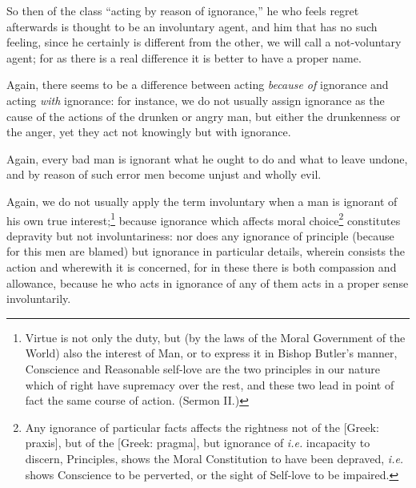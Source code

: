So then of the class “acting by reason of ignorance,” he who feels
regret afterwards is thought to be an involuntary agent, and him that has no
such feeling, since he certainly is different from the other, we will call a
not-voluntary agent; for as there is a real difference it is better to have a
proper name.

Again, there seems to be a difference between acting \emph{because of}
ignorance and acting \emph{with} ignorance: for instance, we do not usually
assign ignorance as the cause of the actions of the drunken or angry man, but
either the drunkenness or the anger, yet they act not knowingly but with
ignorance.

Again, every bad man is ignorant what he ought to do and what to leave undone,
and by reason of such error men become unjust and wholly evil.

Again, we do not usually apply the term involuntary when a man is ignorant of
his own true interest;\footnote{Virtue is not only the duty, but (by the laws of the Moral Government of the
World) also the interest of Man, or to express it in Bishop Butler’s
manner, Conscience and Reasonable self-love are the two principles in our
nature which of right have supremacy over the rest, and these two lead in point
of fact the same course of action. (Sermon II.)}
because ignorance which affects moral choice\footnote{Any ignorance of particular facts affects the rightness not of the [Greek:
praxis], but of the [Greek: pragma], but ignorance of \emph{i.e.} incapacity to
discern, Principles, shows the Moral Constitution to have been depraved,
\emph{i.e.} shows Conscience to be perverted, or the sight of Self-love to be
impaired.}
constitutes depravity but not involuntariness: nor does any ignorance of
principle (because for this men are blamed) but ignorance in particular
details, wherein consists the action and wherewith it is concerned, for in
these there is both compassion and allowance, because he who acts in ignorance
of any of them acts in a proper sense involuntarily.

